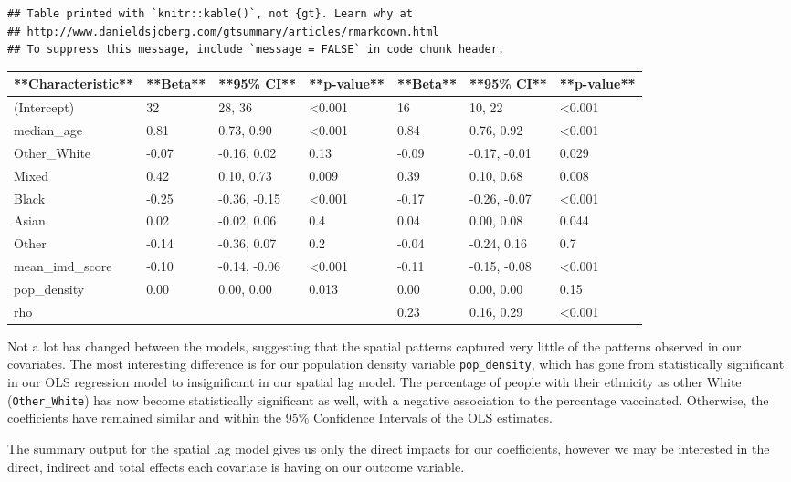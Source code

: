 \documentclass[
]{book}
\begin{document}
\begin{verbatim}
## Table printed with `knitr::kable()`, not {gt}. Learn why at
## http://www.danieldsjoberg.com/gtsummary/articles/rmarkdown.html
## To suppress this message, include `message = FALSE` in code chunk header.
\end{verbatim}

\begin{tabular}{l|l|l|l|l|l|l}
\hline
**Characteristic** & **Beta** & **95\% CI** & **p-value** & **Beta** & **95\% CI** & **p-value**\\
\hline
(Intercept) & 32 & 28, 36 & <0.001 & 16 & 10, 22 & <0.001\\
\hline
median\_age & 0.81 & 0.73, 0.90 & <0.001 & 0.84 & 0.76, 0.92 & <0.001\\
\hline
Other\_White & -0.07 & -0.16, 0.02 & 0.13 & -0.09 & -0.17, -0.01 & 0.029\\
\hline
Mixed & 0.42 & 0.10, 0.73 & 0.009 & 0.39 & 0.10, 0.68 & 0.008\\
\hline
Black & -0.25 & -0.36, -0.15 & <0.001 & -0.17 & -0.26, -0.07 & <0.001\\
\hline
Asian & 0.02 & -0.02, 0.06 & 0.4 & 0.04 & 0.00, 0.08 & 0.044\\
\hline
Other & -0.14 & -0.36, 0.07 & 0.2 & -0.04 & -0.24, 0.16 & 0.7\\
\hline
mean\_imd\_score & -0.10 & -0.14, -0.06 & <0.001 & -0.11 & -0.15, -0.08 & <0.001\\
\hline
pop\_density & 0.00 & 0.00, 0.00 & 0.013 & 0.00 & 0.00, 0.00 & 0.15\\
\hline
rho &  &  &  & 0.23 & 0.16, 0.29 & <0.001\\
\hline
\end{tabular}

Not a lot has changed between the models, suggesting that the spatial patterns captured very little of the patterns observed in our covariates. The most interesting difference is for our population density variable \texttt{pop\_density}, which has gone from statistically significant in our OLS regression model to insignificant in our spatial lag model. The percentage of people with their ethnicity as other White (\texttt{Other\_White}) has now become statistically significant as well, with a negative association to the percentage vaccinated. Otherwise, the coefficients have remained similar and within the 95\% Confidence Intervals of the OLS estimates.

The summary output for the spatial lag model gives us only the direct impacts for our coefficients, however we may be interested in the direct, indirect and total effects each covariate is having on our outcome variable.
\end{document}
